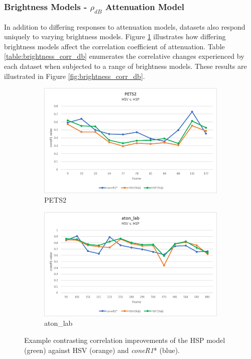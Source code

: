 \FloatBarrier
\subsubsection{Brightness Models - $\rho_{dB}$ Attenuation Model}

In addition to differing responses to attenuation models, datasets also respond uniquely to varying brightness models. Figure \ref{fig:brightness_example} illustrates how differing brightness models affect the correlation coefficient of attenuation. Table \ref{table:brightness_corr_db} enumerates the correlative changes experienced by each dataset when subjected to a range of brightness models. These results are illustrated in Figure \ref{fig:brightness_corr_db}.

\begin{figure}
\centering
\begin{subfigure}{.8\linewidth}
  \includegraphics[width=1\linewidth]{figures/pets2_hsv_hsp.jpg}
  \caption{PETS2}
\end{subfigure}
\hfill
\begin{subfigure}{.8\linewidth}
  \includegraphics[width=1\linewidth]{figures/lab_hsv_hsp.jpg}
  \caption{aton\_lab}
\end{subfigure}

\caption{Example contrasting correlation improvements of the HSP model (green) against HSV (orange) and \textit{coneR1}* (blue). }
\label{fig:brightness_example}
\end{figure}

